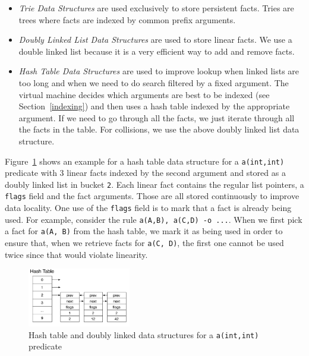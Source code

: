 \begin{itemize}
\item \emph{Trie Data Structures} are used exclusively to store 
  persistent facts. Tries are trees where facts are indexed by common
  prefix arguments.
\item \emph{Doubly Linked List Data Structures} are used to store 
  linear facts. We use a double linked list because it is a very
   efficient way to add and remove facts.
\item \emph{Hash Table Data Structures} are used to improve lookup when 
  linked lists are too long and when we need to do search filtered by
  a fixed argument. The virtual machine decides which arguments are
  best to be indexed (see Section~\ref{indexing}) and then uses a hash table
  indexed by the appropriate argument. If we need to go through all
  the facts, we just iterate through all the facts in the table. For
  collisions, we use the above doubly linked list data structure.
\end{itemize}

Figure~\ref{fig:hash_table} shows an example for a hash table data
structure for a \texttt{a(int,int)} predicate with 3 linear facts
indexed by the second argument and stored as a doubly linked list in
bucket \texttt{2}. Each linear fact contains the regular list
pointers, a \texttt{flags} field and the fact arguments. Those are all
stored continuously to improve data locality. One use of
the \texttt{flags} field is to mark that a fact is already being
used. For example, consider the rule \texttt{a(A,B), a(C,D) -o
...}. When we first pick a fact for \texttt{a(A, B)} from the hash
table, we mark it as being used in order to ensure that, when we
retrieve facts for \texttt{a(C, D)}, the first one cannot be used
twice since that would violate linearity.

\begin{figure}[ht]
\centering
\includegraphics[width=0.4\textwidth]{figures/hash_table.pdf}
\caption{Hash table and doubly linked data structures for 
  a \texttt{a(int,int)} predicate}
\label{fig:hash_table}
\end{figure}


